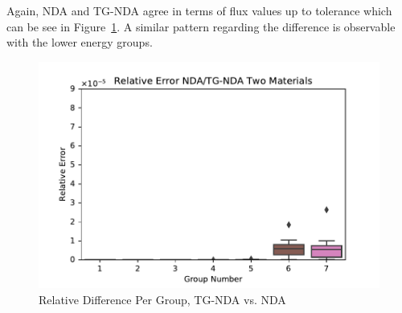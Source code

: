 Again, NDA and TG-NDA agree in terms of flux values up to tolerance which can be see in Figure~\ref{fig:TwoMatErr}. A similar pattern regarding the difference is observable with the lower energy groups.

\begin{figure}[H]
    \centering
    \includegraphics[width=.75\textwidth]{fig/TwoMatErr.pdf}
    \caption{Relative Difference Per Group, TG-NDA vs. NDA}
    \label{fig:TwoMatErr}
\end{figure}




